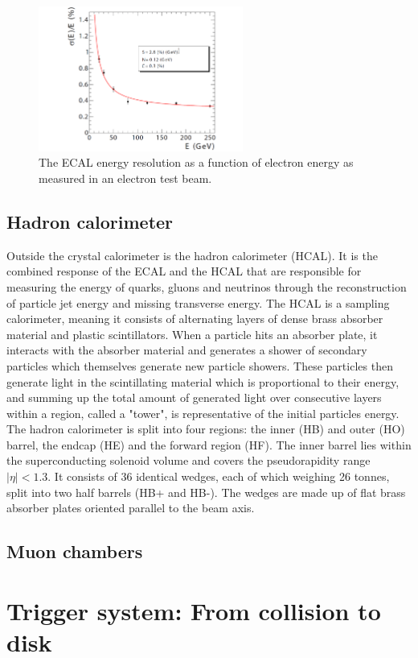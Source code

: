 \begin{figure}[h] 
    \centering
    \includegraphics[width=0.6\textwidth]{figures/cms/ECAL-energy-resolution.pdf}
    \caption{The ECAL energy resolution as a function of electron energy as measured in an electron test beam.}
    \label{fig:cms:ecal-res}
\end{figure}


\subsection{Hadron calorimeter}
Outside the crystal calorimeter is the hadron calorimeter (HCAL). It is the combined response of the ECAL and the HCAL that are responsible for measuring the energy of quarks, gluons and neutrinos through the reconstruction of particle jet energy and missing transverse energy. 
The HCAL is a sampling calorimeter, meaning it consists of alternating layers of dense brass absorber material and plastic scintillators. When a particle hits an absorber plate, it interacts with the absorber material and generates a shower of secondary particles which themselves generate new particle showers. These particles then generate light in the scintillating material which is proportional to their energy, and summing up the total amount of generated light over consecutive layers within a region, called a "tower", is representative of the initial particles energy.
The hadron calorimeter is split into four regions: the inner (HB) and outer (HO) barrel, the endcap (HE) and the forward region (HF).
The inner barrel lies within the superconducting solenoid volume and covers the pseudorapidity range $|\eta|<1.3$.
It consists of 36 identical wedges, each of which weighing 26 tonnes, split into two half barrels (HB+ and HB-).
The wedges are made up of flat brass absorber plates oriented parallel to the beam axis. 

\subsection{Muon chambers}
\section{Trigger system: From collision to disk}
